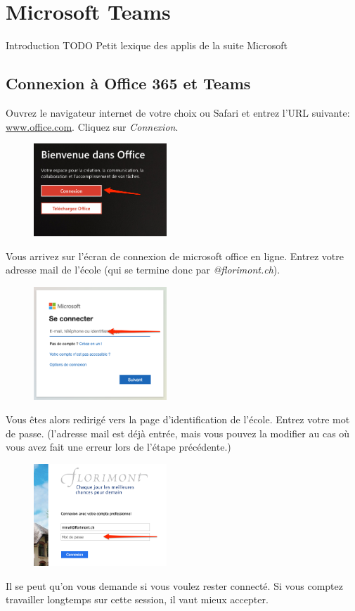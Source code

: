 \chapter{Microsoft Teams}\label{teams1}  


Introduction TODO
Petit lexique des applis de la suite Microsoft


\section{Connexion à Office 365 et Teams}

Ouvrez le navigateur internet de votre choix ou Safari et entrez l'URL suivante: \url{www.office.com}. Cliquez sur \textit{Connexion}.

\begin{figure}[h]
\includegraphics[width=5cm]{./images/teams/ecran_office_com_crop}
\centering
\end{figure}

Vous arrivez sur l'écran de connexion de microsoft office en ligne. Entrez votre adresse mail de l'école (qui se termine donc par \textit{@florimont.ch}).

\begin{figure}[h]
\includegraphics[width=5cm]{./images/teams/ecran_connexion_office_com_crop}
\centering
\end{figure}

Vous êtes alors redirigé vers la page d'identification de l’école. Entrez votre mot de passe. (l'adresse mail est déjà entrée, mais vous pouvez la modifier au cas où vous avez fait une erreur lors de l'étape précédente.)

\begin{figure}[h]
\includegraphics[width=5cm]{./images/teams/ecran_connexion_florimont_crop}
\centering
\end{figure}
\newpage
Il se peut qu'on vous demande si vous voulez rester connecté. Si vous comptez travailler longtemps sur cette session, il vaut mieux accepter.\\

